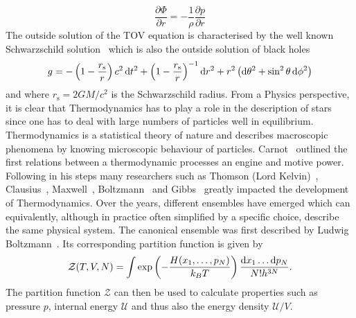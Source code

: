 \begin{equation}
	\frac{\partial \Phi}{\partial r} = - \frac{1}{\rho}\frac{\partial p}{\partial r}
	\label{eq:01-Intr-Hydrostatic-Equilibrium}
\end{equation}
The outside solution of the \ac{TOV} equation is characterised by the well known Schwarzschild solution~\cite{schwarzschildUberGravitationsfeldMassenpunktes1916} which is also the outside solution of black holes
\begin{equation}
	g=-\left(1-\frac{r_{\mathrm{s}}}{r}\right) c^{2} \mathop{}\!\mathrm{d} t^{2}+\left(1-\frac{r_{\mathrm{s}}}{r}\right)^{-1} \mathop{}\!\mathrm{d} r^{2}+r^{2}\left( \mathop{}\!\mathrm{d}\theta^2+\sin^2\theta \mathop{}\!\mathrm{d}\phi^2\right)
	\label{eq:01-Intr-Schwarzschild-Metric}
\end{equation}
and where $r_\mathrm{s}=2GM/c^2$ is the Schwarzschild radius.
From a Physics perspective, it is clear that Thermodynamics has to play a role in the description of stars since one has to deal with large numbers of particles well in equilibrium.
Thermodynamics is a statistical theory of nature and describes macroscopic phenomena by knowing microscopic behaviour of particles.
Carnot~\cite{carnotReflexionsPuissanceMotrice1824} outlined the first relations between a thermodynamic processes an engine and motive power.
Following in his steps many researchers such as Thomson (Lord Kelvin)~\cite{thomsonABSOLUTETHERMOMETRICSCALE2011}, Clausius~\cite{clausiusMechanischeWaermetheorie1876}, Maxwell~\cite{maxwellScientificLettersPapers2002}, Boltzmann~\cite{boltzmannUberMechanischeBedeutung1866} and Gibbs~\cite{gibbsElementaryPrinciplesStatistical2010} greatly impacted the development of Thermodynamics.
Over the years, different ensembles have emerged which can equivalently, although in practice often simplified by a specific choice, describe the same physical system.
The canonical ensemble was first described by Ludwig Boltzmann~\cite{boltzmannUeberEigenschaftenMonocyclischer1885a}.
Its corresponding partition function is given by
\begin{equation}
	\mathcal{Z}(T,V,N) = \int\exp\left(-\frac{H(x_1,\dots,p_N)}{k_B T}\right)\frac{\mathop{}\!\mathrm{d} x_1\dots \mathop{}\!\mathrm{d} p_N}{N!h^{3N}}.
	\label{eq:01-Intr-Canocnical-Ens-Part-Funct}
\end{equation}
The partition function $\mathcal{Z}$ can then be used to calculate properties such as pressure $p$, internal energy $\mathcal{U}$ and thus also the energy density $\mathcal{U}/V$.
